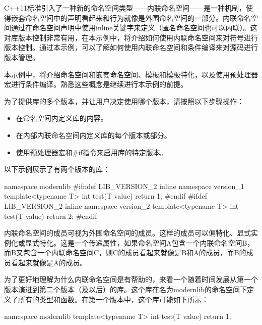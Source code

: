 C++11标准引入了一种新的命名空间类型——内联命名空间——是一种机制，使得嵌套命名空间中的声明看起来和行为就像是外围命名空间的一部分。内联命名空间通过在命名空间声明中使用inline关键字来定义（匿名命名空间也可以内联）。这对库版本控制非常有用，在本示例中，将介绍如何使用内联命名空间来对符号进行版本控制。通过本示例，可以了解如何使用内联命名空间和条件编译来对源码进行版本管理。


本示例中，将介绍命名空间和嵌套命名空间、模板和模板特化，以及使用预处理器宏进行条件编译。熟悉这些概念是继续进行本示例的前提。


为了提供库的多个版本，并让用户决定使用哪个版本，请按照以下步骤操作：

\begin{itemize}
\item
在命名空间内定义库的内容。

\item
在内部内联命名空间内定义库的每个版本或部分。

\item
使用预处理器宏和\#if指令来启用库的特定版本。
\end{itemize}

以下示例展示了有两个版本的库：

\begin{cpp}
namespace modernlib
{
    #ifndef LIB_VERSION_2
    inline namespace version_1
    {
        template<typename T>
        int test(T value) { return 1; }
    }
    #endif
    #ifdef LIB_VERSION_2
    inline namespace version_2
    {
        template<typename T>
        int test(T value) { return 2; }
    }
    #endif
}
\end{cpp}


内联命名空间的成员可视为外围命名空间的成员。这样的成员可以偏特化、显式实例化或显式特化。这是一个传递属性，如果命名空间A包含一个内联命名空间B，而B又包含一个内联命名空间C，则C的成员看起来就像是B和A的成员，而B的成员看起来就像是A的成员。

为了更好地理解为什么内联命名空间是有帮助的，来看一个随着时间发展从第一个版本演进到第二个版本（及以后）的库。这个库在名为modernlib的命名空间下定义了所有的类型和函数。在第一个版本中，这个库可能如下所示：

\begin{cpp}
namespace modernlib
{
    template<typename T>
    int test(T value) { return 1; }
}
\end{cpp}

